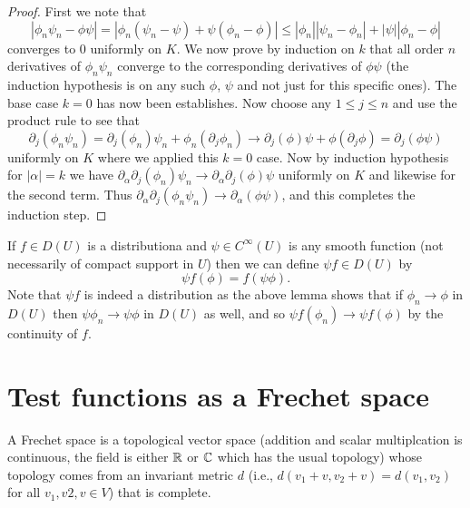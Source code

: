 \documentclass[twoside, a4paper, 10pt]{amsart}
\begin{document}
\begin{proof} First we note that $$|\phi_n \psi_n - \phi \psi| = |\phi_n (\psi_n - \psi) + \psi (\phi_n - \phi)| \leq |\phi_n||\psi_n - \phi_n| + |\psi||\phi_n - \phi|$$ converges to $0$ uniformly on $K$. We now prove by induction on $k$ that all order $n$ derivatives of $\phi_n \psi_n$ converge to the corresponding derivatives of $\phi \psi$ (the induction hypothesis is on any such $\phi$, $\psi$ and not just for this specific ones). The base case $k=0$ has now been establishes. Now choose any $1\leq j \leq n$ and use the product rule to see that $$\partial_j (\phi_n \psi_n) = \partial_j(\phi_n) \psi_n + \phi_n (\partial_j \phi_n) \to \partial_j(\phi) \psi + \phi (\partial_j \phi) = \partial_j(\phi \psi)$$ uniformly on $K$ where we applied this $k=0$ case. Now by induction hypothesis for $|\alpha| = k$ we have $\partial_{\alpha} \partial_j(\phi_n) \psi_n \to \partial_{\alpha} \partial_j(\phi) \psi $ uniformly on $K$ and likewise for the second term. Thus $\partial_{\alpha} \partial_j (\phi_n \psi_n) \to \partial_{\alpha} (\phi \psi)$, and this completes the induction step. \end{proof}

\begin{mydef} If $f \in D(U)$ is a distributiona and $\psi \in C^{\infty}(U)$ is any smooth function (not necessarily of compact support in $U$) then we can define $\psi f \in D(U)$ by $$\psi f (\phi) = f(\psi \phi).$$ Note that $\psi f$ is indeed a distribution as the above lemma shows that if $\phi_n \to \phi$ in $D(U)$ then $\psi \phi_n \to \psi \phi$ in $D(U)$ as well, and so $\psi f (\phi_n) \to \psi f(\phi)$ by the continuity of $f$.

\end{mydef}
\section{Test functions as a Frechet space}

\begin{mydef} A Frechet space is a topological vector space (addition and scalar multiplcation is continuous, the field is either $\mathbb{R}$ or $\mathbb{C}$ which has the usual topology) whose topology comes from an invariant metric $d$ (i.e., $d(v_1+v, v_2+v) = d(v_1, v_2)$ for all $v_1,v2,v \in V$) that is complete.

\end{mydef}
\end{document}
